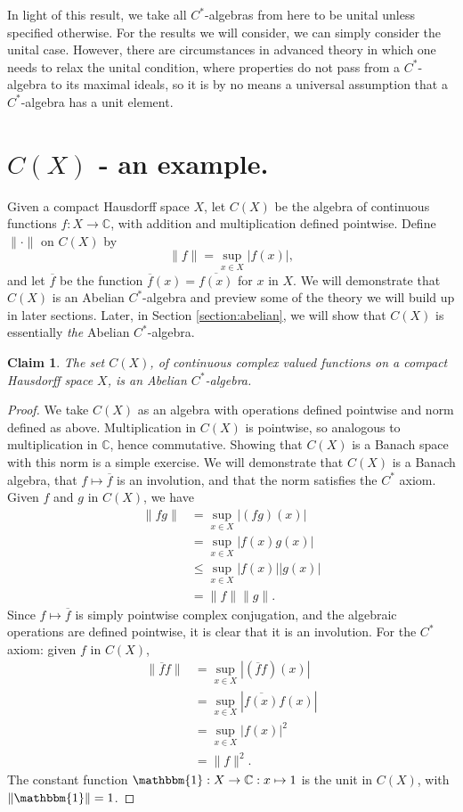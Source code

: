 \documentclass[12pt,a4paper]{report}
\theoremstyle{plain}
\newtheorem*{claim}{Claim}
\theoremstyle{definition}
\newcommand{\1}{\mathbbm{1}}
\newcommand{\C}{\mathbb{C}}
\newcommand{\CX}{C(X)}
\renewcommand{\bar}{\overline}
\begin{document}
In light of this result, we take all $C^\ast$-algebras from here to be unital unless
specified otherwise. For the results we will consider, we can simply consider the unital case. 
However, there are circumstances in advanced theory in which one needs to relax the unital 
condition, where properties do not pass from a $C^\ast$-algebra to its maximal ideals, so it is by no 
means a universal assumption that a $C^\ast$-algebra has a unit element.


\section{$\CX$ - an example.} \label{section:CX}
Given a compact Hausdorff space $X$, let $\CX$ be the algebra of continuous functions
$f:X\to\C$, with addition and multiplication defined pointwise. Define $\|\cdot\|$ on $\CX$ by
\[
	\|f\|= \sup_{x\in X}{|f(x)|},
\]
and let $\overline f$ be the function $\overline f(x) = \overline{f(x)}$ for $x$ in $X$.
We will demonstrate that $\CX$ is an Abelian $C^\ast$-algebra and preview some of the theory
we will build up in later sections. Later, in Section \ref{section:abelian}, we will show that $\CX$ is 
essentially \emph{the} Abelian $C^\ast$-algebra.

\begin{claim}
	The set $\CX$, of continuous complex valued functions on a compact Hausdorff space $X$, is an 
	Abelian $C^\ast$-algebra.
\end{claim}
\begin{proof}
	We take $\CX$ as an algebra with operations defined pointwise and norm defined as above.
	Multiplication in $\CX$ is pointwise, so analogous to multiplication in $\C$, hence commutative.
	Showing that $\CX$ is a Banach space with this norm is a simple exercise. We will demonstrate that $
	\CX$ is a Banach algebra, that $f\mapsto\overline{f}$ is an involution, and that the norm satisfies 
	the $C^\ast$ axiom.
	Given $f$ and $g$ in $\CX$, we have 
	\begin{align*}
				\|fg\| 
		&= 		\sup_{x\in X}|(fg)(x)|											\\
		&= 		\sup_{x\in X}|f(x)g(x)|											\\
		&\leq	\sup_{x\in X}|f(x)||g(x)|										\\
		&=		\|f\|\|g\|.
	\end{align*}
	Since $f\mapsto\overline{f}$ is simply pointwise complex conjugation, and the algebraic operations are defined pointwise, it is clear that it is an involution. For the $C^\ast$ axiom: given $f$ in $\CX$,
	\begin{align*}
				\|\bar f f\| 
		&= 		\sup_{x\in X}|(\bar f f)(x)|									\\
		&= 		\sup_{x\in X}|\bar{f(x)} f(x)|									\\
		&=		\sup_{x\in X}|f(x)|^2											\\
		&=		\|f\|^2.
	\end{align*}
	The constant function $\1:X\to\C:x\mapsto 1$ is the unit in $\CX$, with $\|\1\| = 1$.
\end{proof}
\end{document}
